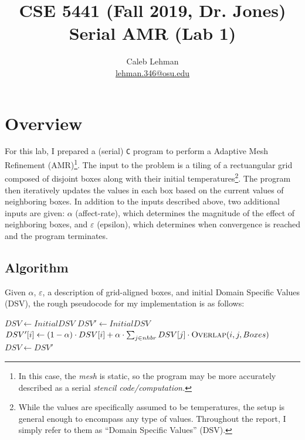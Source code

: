 \documentclass{article}
\title{
CSE 5441 (Fall 2019, Dr. Jones)\\
\large Serial AMR (Lab 1)
}
\author{
Caleb Lehman \\
\href{mailto:lehman.346@osu.edu}{lehman.346@osu.edu}
}
\begin{document}
\maketitle

\section*{Overview}
\label{sec:overview}

For this lab, I prepared a (serial) \texttt{C} program to perform a
Adaptive Mesh Refinement (AMR)\footnote{In this case, the \emph{mesh} is static,
so the program may be more accurately described as a serial \emph{stencil
code/computation.}}. The input to the problem is a tiling of a rectuangular
grid composed of disjoint boxes along with their initial
temperatures\footnote{While the values are specifically assumed to be temperatures,
the setup is general enough to encompass any type of values. Throughout the
report, I simply refer to them as ``Domain Specific Values'' (DSV).}. The
program then iteratively updates the values in each box based on the current
values of neighboring boxes. In addition to the inputs described above, two
additional inputs are given: $\alpha$ (affect-rate), which determines the
magnitude of the effect of neighboring boxes, and $\varepsilon$ (epsilon),
which determines when convergence is reached and the program terminates.

\subsection*{Algorithm}
\label{subsec:algorithm}

Given $\alpha$, $\varepsilon$, a description of grid-aligned boxes, and initial
Domain Specific Values (DSV), the rough pseudocode for my implementation is as
follows:

\begin{algorithm}
\begin{algorithmic}[1]
\State $DSV \gets Initial DSV$
\State $DSV' \gets Initial DSV$
 \label{alg:amr:convergence}
        \State $DSV'[i] \gets (1 - \alpha)\cdot DSV[i] + \alpha \cdot \sum_{j\in nhbr} DSV[j]\cdot \Call{Overlap}{i, j, Boxes}$ \label{alg:amr:stencil}
    \EndFor
    \State $DSV \gets DSV'$ \label{alg:amr:commit}
\EndWhile
\EndProcedure
\end{algorithmic}
\end{algorithm}
\end{document}
